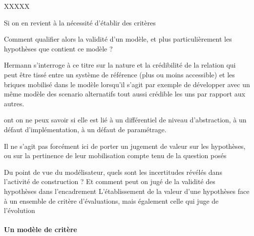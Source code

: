 


XXXXX





Si on en revient à la nécessité d'établir des critères 




Comment qualifier alors la validité d'un modèle, et plus particulièrement les hypothèses que contient ce modèle ?

Hermann s'interroge à ce titre sur la nature et la crédibilité de la relation qui peut être tissé entre un système de référence (plus ou moins accessible) et les briques mobilisé dans le modèle lorsqu'il s'agit par exemple de développer avec un même modèle des scenario alternatifs tout aussi crédible les uns par rapport aux autres.



\autocite{Cottineau2014a}


ont on ne peux savoir si elle est lié à un différentiel de niveau d'abstraction, à un défaut d'implémentation, à un défaut de paramétrage.

Il ne s'agit pas forcément ici de porter un jugement de valeur sur les hypothèses, ou sur la pertinence de leur mobilisation compte tenu de la question posés


Du point de vue du modélisateur, quels sont les incertitudes révélés dans l'activité de construction ? Et comment peut on jugé de la validité des hypothèses dans l'encadrement L'établissement de la valeur d'une hypothèses face à un ensemble de critère d'évaluations, mais également celle qui juge de l'évolution


\paragraph{Un modèle de critère}

